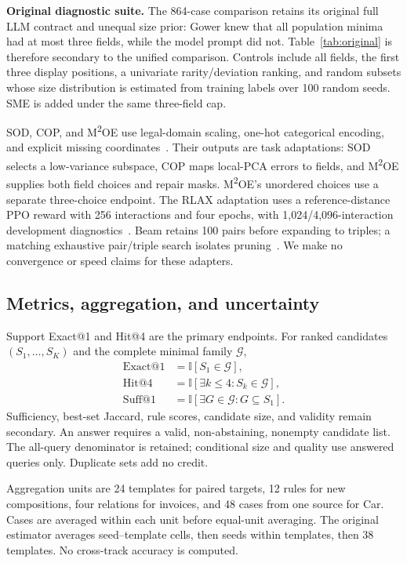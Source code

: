 \documentclass[conference]{IEEEtran}
\begin{document}
\textbf{Original diagnostic suite.} The 864-case comparison retains its original full LLM contract and unequal size prior: Gower knew that all population minima had at most three fields, while the model prompt did not. Table~\ref{tab:original} is therefore secondary to the unified comparison. Controls include all fields, the first three display positions, a univariate rarity/deviation ranking, and random subsets whose size distribution is estimated from training labels over 100 random seeds. SME is added under the same three-field cap.

SOD, COP, and M\textsuperscript{2}OE use legal-domain scaling, one-hot categorical encoding, and explicit missing coordinates~\cite{kriegel2009sod,angiulli2024m2oe}. Their outputs are task adaptations: SOD selects a low-variance subspace, COP maps local-PCA errors to fields, and M\textsuperscript{2}OE supplies both field choices and repair masks. M\textsuperscript{2}OE's unordered choices use a separate three-choice endpoint. The RLAX adaptation uses a reference-distance PPO reward with 256 interactions and four epochs, with 1,024/4,096-interaction development diagnostics~\cite{amirato2026rlax}. Beam retains 100 pairs before expanding to triples; a matching exhaustive pair/triple search isolates pruning~\cite{myrtakis2021comparative}. We make no convergence or speed claims for these adapters.

\subsection{Metrics, aggregation, and uncertainty}
Support Exact@1 and Hit@4 are the primary endpoints. For ranked candidates $(S_1,\ldots,S_K)$ and the complete minimal family $\mathcal G$,
\begin{align}
\mathrm{Exact@1}&=\mathbb I[S_1\in\mathcal G],\\
\mathrm{Hit@4}&=\mathbb I[\exists k\leq4:S_k\in\mathcal G],\\
\mathrm{Suff@1}&=\mathbb I[\exists G\in\mathcal G:G\subseteq S_1].
\end{align}
Sufficiency, best-set Jaccard, rule scores, candidate size, and validity remain secondary. An answer requires a valid, non-abstaining, nonempty candidate list. The all-query denominator is retained; conditional size and quality use answered queries only. Duplicate sets add no credit.

Aggregation units are 24 templates for paired targets, 12 rules for new compositions, four relations for invoices, and 48 cases from one source for Car. Cases are averaged within each unit before equal-unit averaging. The original estimator averages seed--template cells, then seeds within templates, then 38 templates. No cross-track accuracy is computed.
\end{document}
